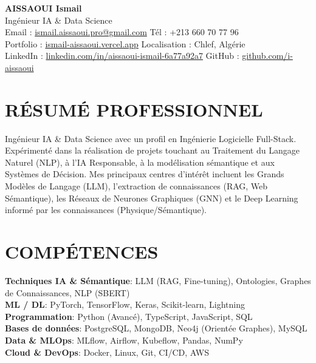 \documentclass[a4paper,12pt]{article}
\begin{document}
\begin{center}
    {\Huge\bfseries\color{titleblue} AISSAOUI Ismail}\\[4pt]
    {\Large Ingénieur IA \& Data Science}\\[6pt]

    {\normalsize
    Email : \href{mailto:ismail.aissaoui.pro@gmail.com}{ismail.aissaoui.pro@gmail.com} \quad
    Tél : +213 660 70 77 96 \\
    Portfolio : \href{https://ismail-aissaoui.vercel.app}{ismail-aissaoui.vercel.app} \quad
    Localisation : Chlef, Algérie \\
    LinkedIn : \href{https://linkedin.com/in/aissaoui-ismail-6a77a92a7}{linkedin.com/in/aissaoui-ismail-6a77a92a7} \quad
    GitHub : \href{https://github.com/i-aissaoui}{github.com/i-aissaoui}
    }
\end{center}

\section{RÉSUMÉ PROFESSIONNEL}
Ingénieur IA \& Data Science avec un profil en Ingénierie Logicielle Full-Stack. Expérimenté dans la réalisation de projets touchant au Traitement du Langage Naturel (NLP), à l'IA Responsable, à la modélisation sémantique et aux Systèmes de Décision. Mes principaux centres d'intérêt incluent les Grands Modèles de Langage (LLM), l'extraction de connaissances (RAG, Web Sémantique), les Réseaux de Neurones Graphiques (GNN) et le Deep Learning informé par les connaissances (Physique/Sémantique).

\section{COMPÉTENCES}
\textbf{Techniques IA \& Sémantique}: LLM (RAG, Fine-tuning), Ontologies, Graphes de Connaissances, NLP (SBERT) \\
\textbf{ML / DL}: PyTorch, TensorFlow, Keras, Scikit-learn, Lightning \\
\textbf{Programmation}: Python (Avancé), TypeScript, JavaScript, SQL \\
\textbf{Bases de données}: PostgreSQL, MongoDB, Neo4j (Orientée Graphes), MySQL \\
\textbf{Data \& MLOps}: MLflow, Airflow, Kubeflow, Pandas, NumPy \\
\textbf{Cloud \& DevOps}: Docker, Linux, Git, CI/CD, AWS
\end{document}
